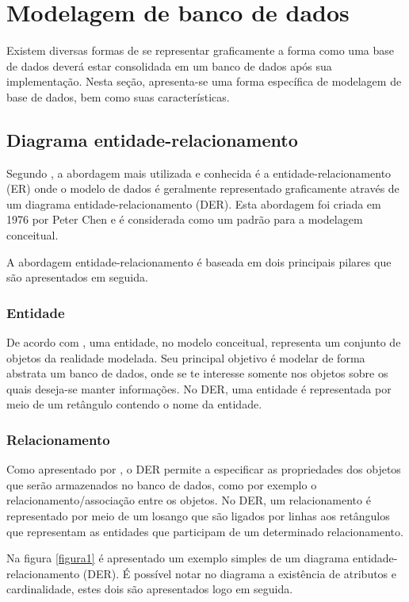 \section{Modelagem de banco de dados}

Existem diversas formas de se representar graficamente a forma como uma base de dados deverá estar consolidada em um banco de
dados após sua implementação. Nesta seção, apresenta-se uma forma específica de modelagem de base de dados, bem como suas características.

\subsection{Diagrama entidade-relacionamento}
Segundo  , a abordagem mais utilizada e conhecida é a 
entidade-relacionamento (ER) onde o modelo de dados é geralmente representado graficamente através
de um diagrama entidade-relacionamento (DER). Esta abordagem foi criada em 1976 por Peter Chen e
é considerada como um padrão para a modelagem conceitual.

A abordagem entidade-relacionamento é baseada em dois principais pilares que são apresentados em seguida.

\subsubsection{Entidade}
De acordo com , uma entidade, no modelo conceitual, representa um conjunto
de objetos da realidade modelada. Seu principal objetivo é modelar de forma abstrata um banco de dados, onde
se te interesse somente nos objetos sobre os quais deseja-se manter informações. No DER, uma entidade é representada
por meio de um retângulo contendo o nome da entidade.
 
\subsubsection{Relacionamento}
Como apresentado por , o DER permite a especificar as propriedades dos objetos
que serão armazenados no banco de dados, como por exemplo o relacionamento/associação entre os objetos. No DER,
um relacionamento é representado por meio de um losango que são ligados por linhas aos retângulos que representam
as entidades que participam de um determinado relacionamento.

Na figura \ref{figura1} é apresentado um exemplo simples de um diagrama entidade-relacionamento (DER). É possível notar 
no diagrama a existência de atributos e cardinalidade, estes dois são apresentados logo em seguida.

